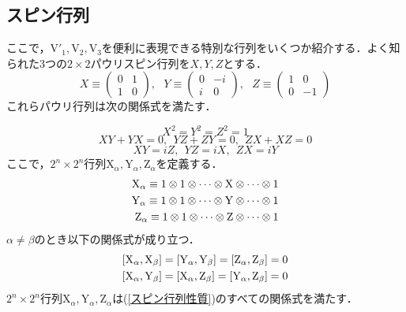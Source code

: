 \documentclass[a4paper,11pt]{jsreport}
\begin{document}
\subsection{スピン行列}
ここで，$\mathrm{V}'_1, \mathrm{V}_2, \mathrm{V}_3$を便利に表現できる特別な行列をいくつか紹介する．よく知られた3つの$2 \times 2$パウリスピン行列を$X, Y, Z$とする．
\begin{equation}
  X \equiv \begin{pmatrix}
    0 & 1 \\ 1 & 0
  \end{pmatrix}, \ \ \
  Y \equiv \begin{pmatrix}
    0 & -i \\ i & 0
  \end{pmatrix}, \ \ \
  Z \equiv \begin{pmatrix}
    1 & 0 \\ 0 & -1
  \end{pmatrix}
\end{equation}
これらパウリ行列は次の関係式を満たす．\par
\begin{equation*}
  X^2 = Y^2 = Z^2 = 1
\end{equation*}
\begin{equation}
  XY + YX = 0, \ \ YZ + ZY = 0, \ \ ZX + XZ = 0
  \label{スピン行列性質}
\end{equation}
\begin{equation*}
  XY = iZ, \ \ YZ = iX, \ \ ZX = iY
\end{equation*}
ここで，$2^n \times 2^n$行列$\mathrm{X}_{\alpha}, \mathrm{Y}_{\alpha}, \mathrm{Z}_{\alpha}$を定義する．
\begin{align}
  \mathrm{X}_{\alpha} \equiv 1 \otimes 1 \otimes \cdots \otimes \mathrm{X} \otimes \cdots \otimes 1 \notag \\
  \mathrm{Y}_{\alpha} \equiv 1 \otimes 1 \otimes \cdots \otimes \mathrm{Y} \otimes \cdots \otimes 1        \\
  \mathrm{Z}_{\alpha} \equiv 1 \otimes 1 \otimes \cdots \otimes \mathrm{Z} \otimes \cdots \otimes 1 \notag
\end{align}
$\alpha \neq \beta$のとき以下の関係式が成り立つ．
\begin{align}
   & [\mathrm{X}_{\alpha}, \mathrm{X}_{\beta}]
  = [\mathrm{Y}_{\alpha}, \mathrm{Y}_{\beta}]
  = [\mathrm{Z}_{\alpha}, \mathrm{Z}_{\beta}]
  = 0 \notag                                   \\
   & [\mathrm{X}_{\alpha}, \mathrm{Y}_{\beta}]
  = [\mathrm{X}_{\alpha}, \mathrm{Z}_{\beta}]
  = [\mathrm{Y}_{\alpha}, \mathrm{Z}_{\beta}]
  = 0
\end{align}
$2^n \times 2^n$行列$\mathrm{X}_{\alpha}, \mathrm{Y}_{\alpha}, \mathrm{Z}_{\alpha}$は(\ref{スピン行列性質})のすべての関係式を満たす．
\end{document}
